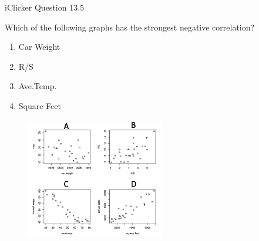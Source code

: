 \documentclass[14pt]{beamer}\usepackage[]{graphicx}\usepackage[]{color}
\begin{document}
\begin{frame}[fragile]{iClicker Question 13.5}

Which of the following graphs has the strongest negative correlation?

\begin{minipage}[ht]{4cm}

\begin{enumerate}[A]
\item Car Weight
\item R/S
\item Ave.Temp.
\item Square Feet
\end{enumerate}
\end{minipage}
\begin{minipage}[ht]{6cm}

\begin{figure}[htbp]
   \centering
   \includegraphics[width=6cm]{chapters/chapter13/figure/fig3.png} %
\end{figure}
\end{minipage}
\end{frame}




%


\end{document}
